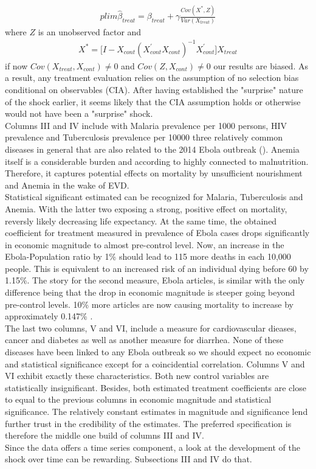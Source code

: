 \documentclass{article}
\begin{document}
\begin{align*}
plim \widehat{\beta}_{treat} = \beta_{treat} + \gamma \frac{Cov(X^*,Z)}{Var(X_{treat})}
\end{align*} 
where $Z$ is an unobserved factor and 
\begin{align*}
X^* = \big[ I - X_{cont}(X^{'}_{cont} X_{cont})^{-1} X^{'}_{cont} \big] X_{treat}
\end{align*}
if now $Cov(X_{treat}, X_{cont}) \neq 0$ and $Cov(Z, X_{cont}) \neq 0$ our results are biased. As a result, any treatment evaluation relies on the assumption of no selection bias conditional on observables (CIA). After having established the "surprise" nature of the shock earlier, it seems likely that the CIA assumption holds or otherwise would not have been a "surprise" shock.\\
Columns III and IV include with Malaria prevalence per 1000 persons, HIV prevalence and Tuberculosis prevalence per 10000 three relatively common diseases in general that are also related to the 2014 Ebola outbreak (\cite{parpia2016effects}). Anemia itself is a considerable burden and according to \cite{ehrhardt2006malaria} highly connected to malnutrition. Therefore, it captures potential effects on mortality by unsufficient nourishment and Anemia in the wake of EVD. \\
Statistical significant estimated can be recognized for Malaria, Tuberculosis and Anemia. With the latter two exposing a strong, positive effect on mortality, reversly likely decreasing life expectancy. At the same time, the obtained coefficient for treatment measured in prevalence of Ebola cases drops significantly in economic magnitude to almost pre-control level. Now, an increase in the Ebola-Population ratio by 1\% should lead to 115 more deaths in each 10,000 people. This is equivalent to an increased risk of an individual dying before 60 by 1.15\%. 
The story for the second measure, Ebola articles, is similar with the only difference being that the drop in economic magnitude is steeper going beyond pre-control levels. 10\% more articles are now causing mortality to increase by approximately 0.147\% .\\
The last two columns, V and VI, include a measure for cardiovascular dieases, cancer and diabetes as well as another measure for diarrhea. None of these diseases have been linked to any Ebola outbreak so we should expect no economic and statistical significance except for a coincidential correlation. Columns V and VI exhibit exactly these characteristics. Both new control variables are statistically insignificant. Besides, both estimated treatment coefficients are close to equal to the previous columns in economic magnitude and statistical significance. The relatively constant estimates in magnitude and significance lend further trust in the credibility of the estimates. The preferred specification is therefore the middle one build of columns III and IV. \\
Since the data offers a time series component, a look at the development of the shock over time can be rewarding. Subsections III and IV do that.
\end{document}
